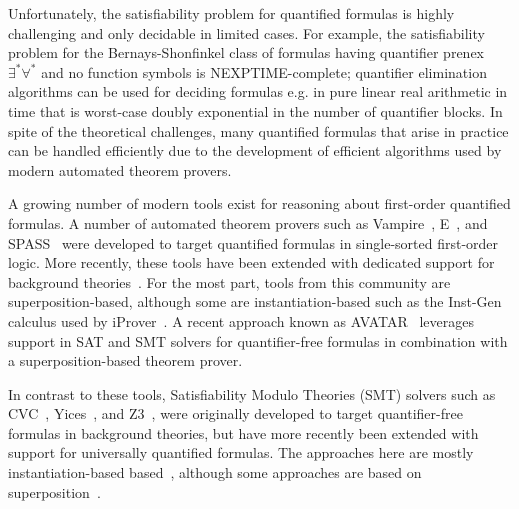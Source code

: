 \documentclass{easychair}
\begin{document}
Unfortunately, the satisfiability problem for quantified formulas is highly challenging 
and only decidable in limited cases.
For example,
the satisfiability problem for the Bernays-Shonfinkel class of formulas
having quantifier prenex $\exists^\ast \forall^\ast$ and no function symbols
is NEXPTIME-complete;
quantifier elimination algorithms can be used for deciding 
formulas e.g. in pure linear real arithmetic in time that is worst-case doubly exponential in the number of quantifier blocks.
In spite of the theoretical challenges, many quantified formulas that arise in practice
can be handled efficiently due to the development of efficient algorithms used by modern automated theorem provers.

A growing number of modern tools exist for reasoning about first-order quantified formulas.
A number of automated theorem provers
such as Vampire~\cite{DBLP:conf/cav/KovacsV13}, E~\cite{schulz2002brainiac}, and SPASS~\cite{weidenbach2009spass}
were developed to target quantified formulas in single-sorted first-order logic.
More recently, these tools have been extended with dedicated support for background theories~\cite{DBLP:conf/frocos/AlthausKW09,DBLP:conf/cade/BaumgartnerBW15}.
For the most part, tools from this community are superposition-based,
although some are instantiation-based such as the Inst-Gen calculus used by iProver~\cite{ganzinger2003new}.
A recent approach known as AVATAR~\cite{DBLP:conf/cade/RegerSV15} leverages support in SAT and SMT solvers for quantifier-free formulas
in combination with a superposition-based theorem prover.

In contrast to these tools, Satisfiability Modulo Theories (SMT) solvers such as CVC~\cite{stump2002cvc}, Yices~\cite{dutertre2006yices}, and Z3~\cite{Z3}, 
were originally developed to target quantifier-free formulas in background theories,
but have more recently been extended with support for universally quantified formulas.
The approaches here are mostly instantiation-based based~\cite{Detlefs03simplify:a,MouraBjoerner07,GeBarrettTinelli07},
although some approaches are based on superposition~\cite{de2008engineering}.
\end{document}
